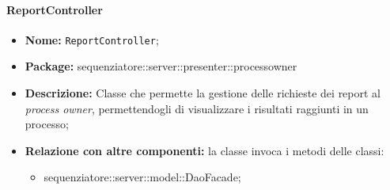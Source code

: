 \paragraph{ReportController}
	\begin{itemize}
		\item \textbf{Nome:} \texttt{ReportController};
		\item \textbf{Package:} sequenziatore::server::presenter::processowner
		\item \textbf{Descrizione:} Classe che permette la gestione delle richieste dei report al \textit{process owner}, permettendogli di visualizzare i risultati raggiunti in un processo;
		\item \textbf{Relazione con altre componenti:} la classe invoca i metodi delle classi:
		\begin{itemize}
			\item sequenziatore::server::model::DaoFacade;
		\end{itemize}
	\end{itemize}
